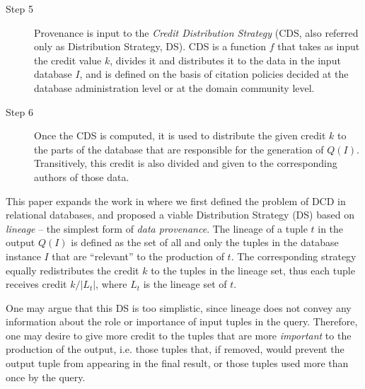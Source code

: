 \begin{description}
{	}
	\item[Step 5] Provenance is input to the 
	 \emph{Credit Distribution Strategy} (CDS, also referred only as Distribution Strategy, DS). CDS is a function $f$ that takes as input the credit value $k $, divides it and distributes it to the data in the input database $I$, and is defined on the basis of citation policies decided at the database administration level or at the domain community level. 
	\item[Step 6] Once the CDS is computed, it is used to distribute the given credit $k$ to the parts of the database that are responsible for the generation of $Q(I)$. Transitively, this credit is also divided and given to the corresponding authors of those data.
\end{description}

This paper expands the work in \citep{dosso2020data} %
where we first defined the problem of DCD in relational databases, and proposed a viable Distribution Strategy (DS) based on \emph{lineage} -- the simplest form of \emph{data provenance}.
The lineage of a tuple $t$ in the output $Q(I)$ is defined as the set of all and only the tuples in the database instance $I$ that are ``relevant'' to the production of $t$.
The corresponding strategy equally redistributes the credit $k$ to the tuples in the lineage set, thus each tuple receives credit $k/|L_t|$, where $L_t$ is the lineage set of $t$. 

One may argue that this DS is too simplistic, since lineage 
does not convey any information about the role or importance of input tuples in the query.
Therefore, one may desire to give more credit to the tuples that are more {\em important} to the production of the output, i.e. those tuples that, if removed, would prevent the output tuple from appearing in the final result, or those tuples used more than once  by the query. 

